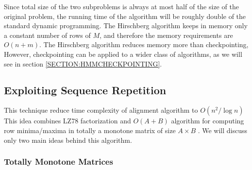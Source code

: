 \begin{comment}
To determine $j$, such that $X_i,i=\lceil n/2\rceil$ is aligned to $Y_j$ (or
$X_i$ is aligned to gap right after $Y_j$) HA uses following algorithm: Let
$B(X,Y)$ be the algorithm, that computes for $X$ and $Y$ vector $LL(k)$, where
$LL(k)=M[n-1,k]$ ($LL$ is the last row of $M$). This can be computed in
$O(nm)$ time and $O(n+m)$ memory using algorithm from section
\ref{SECTION:NEEDLE}.  

We compute a vector $LL_1=B(X[0:i],Y)$. $LL_1[k]$ contains score of the optimal
alignment of $X[0:i]$ and $Y[0,k]$. Let $LL_2[k]$ contains score of the optimal
alignment of $X[i,n]$ and $Y[k,m]$. Then $LL_2=B( (X[i,n])^R,Y^R)^R$.
Searched column $j$ is column that maximizes $\max\{LL_1[j]+d+LL_2[j],
LL_1[j-1]+LL_2[j] \}$.
\end{comment}

Since total size of the two subproblems is always at most half of the size of the
original problem, the running time of the algorithm will be roughly double of
the standard dynamic programming.
The Hirschberg algorithm keeps in memory only a constant number
of rows of $M$,  and therefore the memory requirements are
$O(n+m)$. The Hirschberg algorithm reduces memory more than checkpointing, 
However, checkpointing can be applied to a wider class of algorithms, as we will
see in section \ref{SECTION:HMMCHECKPOINTING}.

\subsection{Exploiting Sequence Repetition}

This technique reduce time complexity of alignment algorithm to $O(n^2/\log n)$
This idea combines LZ78 factorization \cite{Lempel1976} and
$O(A+B)$ algorithm for computing row minima/maxima in totally a monotone matrix of
size $A\times B$ \cite{Aggarwal1987}. We will discuss only two main ideas behind
this algorithm. 

\subsubsection{Totally Monotone Matrices}

